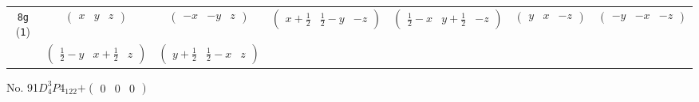 \documentclass[fleqn,9pt,landscape]{jsarticle}
\begin{document}
\begin{center}
\begin{longtable}{ccccccc}
{\tt 8g} ({\tt 1}) & $ \begin{pmatrix} x & y & z \end{pmatrix} $ & $ \begin{pmatrix} - x & - y & z \end{pmatrix} $ & $ \begin{pmatrix} x + \frac{1}{2} & \frac{1}{2} - y & - z \end{pmatrix} $ & $ \begin{pmatrix} \frac{1}{2} - x & y + \frac{1}{2} & - z \end{pmatrix} $ & $ \begin{pmatrix} y & x & - z \end{pmatrix} $ & $ \begin{pmatrix} - y & - x & - z \end{pmatrix} $ \\
& $ \begin{pmatrix} \frac{1}{2} - y & x + \frac{1}{2} & z \end{pmatrix} $ & $ \begin{pmatrix} y + \frac{1}{2} & \frac{1}{2} - x & z \end{pmatrix} $ & $  $ & $  $ & $  $ & $  $ \\
\end{longtable}
\end{center}
\newpage
No. 91\quad$D_{4}^{3}$\quad$P4_122$\quad[ tetragonal ]\quad$+\begin{pmatrix} 0 & 0 & 0 \end{pmatrix}$
\end{document}
